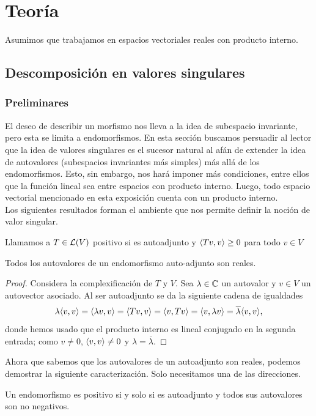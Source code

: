 \chapter{Teoría}
Asumimos que trabajamos en espacios vectoriales reales con producto interno.\\
\section{Descomposición en valores singulares}
\subsection{Preliminares}
El deseo de describir un morfismo nos lleva a la idea de subespacio invariante, pero esta se limita a endomorfismos. En esta sección buscamos persuadir al lector que la idea de valores singulares es el sucesor natural al afán de extender la idea de autovalores (subespacios invariantes más simples) más allá de los endomorfismos. Esto, sin embargo, nos hará imponer más condiciones, entre ellos que la función lineal sea entre espacios con producto interno. Luego, todo espacio vectorial mencionado en esta exposición cuenta con un producto interno.\\
Los siguientes resultados forman el ambiente que nos permite definir la noción de valor singular.
\begin{definition}
	Llamamos a $T\in\mathcal{L}(V)$ positivo si es autoadjunto y $\langle Tv,v\rangle\geq 0$ para todo $v\in V$
\end{definition}
\begin{lemma}
	Todos los autovalores de un endomorfismo auto-adjunto son reales.
\end{lemma}
\begin{proof}
	Considera la complexificación de $T$ y $V$. Sea $\lambda\in\mathbb{C}$ un autovalor y $v\in V$ un autovector asociado. Al ser autoadjunto se da la siguiente cadena de igualdades \[
		\lambda \langle v,v\rangle=\langle\lambda v, v\rangle=\langle Tv,v\rangle=\langle v,Tv\rangle=\langle v,\lambda v\rangle=\overline{\lambda}\langle v,v\rangle,
	\] donde hemos usado que el producto interno es lineal conjugado en la segunda entrada; como $v\neq 0$, $\langle v,v\rangle\neq 0$ y $\lambda=\overline{\lambda}$.
\end{proof}
Ahora que sabemos que los autovalores de un autoadjunto son reales, podemos demostrar la siguiente caracterización. Solo necesitamos una de las direcciones.
\begin{proposition}
	Un endomorfismo es positivo si y solo si es autoadjunto y todos sus autovalores son no negativos.
\end{proposition}
